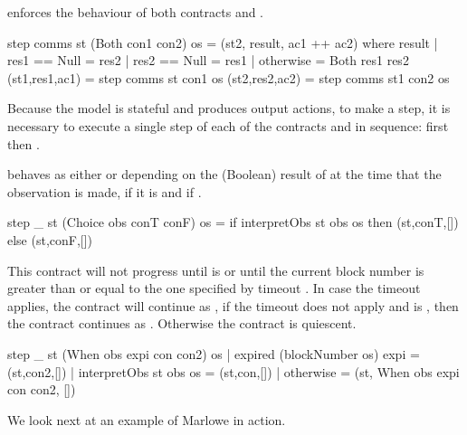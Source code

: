 \documentclass[runningheads]{llncs}
\begin{document}
\medskip
\noindent
{} enforces the behaviour of both contracts  and . 
\begin{haskellcode}
step comms st (Both con1 con2) os =
    (st2, result, ac1 ++ ac2)
    where
        result | res1 == Null = res2
               | res2 == Null = res1
               | otherwise = Both res1 res2
        (st1,res1,ac1) = step comms st con1 os
        (st2,res2,ac2) = step comms st1 con2 os
\end{haskellcode}
Because the model is stateful and produces output actions, to make a step, it is necessary to execute a single step of 
each of  the contracts  and  in sequence: first  then 
.

\medskip
\noindent
{} behaves as either  or  depending on the 
(Boolean) result of  at the time that the observation is made,  if it is 
 and  if .

\begin{haskellcode}
step _ st (Choice obs conT conF) os =
    if interpretObs st obs os
        then (st,conT,[])
        else (st,conF,[])
\end{haskellcode}

\medskip
\noindent
{} This contract will not progress until  is 
 or until the current block number is greater than or equal to the one specified by timeout 
. In case the timeout applies, the contract will continue as , if the timeout 
does not apply and  is , then the contract continues as . 
Otherwise the contract is quiescent.

\begin{haskellcode}
step _ st (When obs expi con con2) os
  | expired (blockNumber os) expi = (st,con2,[])
  | interpretObs st obs os = (st,con,[])
  | otherwise = (st, When obs expi con con2, [])
  \end{haskellcode}
We look next at an example of Marlowe in action.
\end{document}
